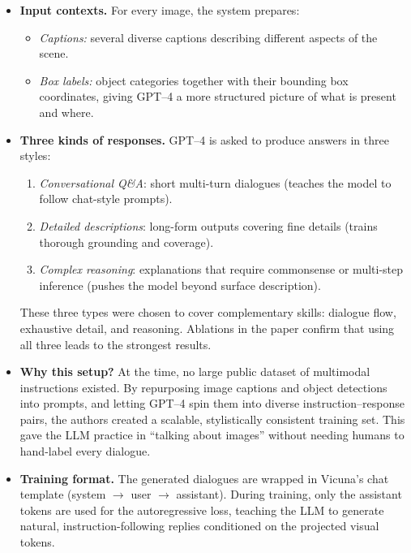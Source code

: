\begin{enrichment}
\begin{enrichment}
        \begin{itemize}
            \item \textbf{Input contexts.} For every image, the system prepares:
            \begin{itemize}
                \item \emph{Captions:} several diverse captions describing different aspects of the scene.  
                \item \emph{Box labels:} object categories together with their bounding box coordinates, giving GPT--4 a more structured picture of what is present and where.
            \end{itemize}
            
            \item \textbf{Three kinds of responses.} GPT--4 is asked to produce answers in three styles:
            \begin{enumerate}
                \item \emph{Conversational Q\&A}: short multi-turn dialogues (teaches the model to follow chat-style prompts).  
                \item \emph{Detailed descriptions}: long-form outputs covering fine details (trains thorough grounding and coverage).  
                \item \emph{Complex reasoning}: explanations that require commonsense or multi-step inference (pushes the model beyond surface description).  
            \end{enumerate}
            These three types were chosen to cover complementary skills: dialogue flow, exhaustive detail, and reasoning. Ablations in the paper confirm that using all three leads to the strongest results.
            
            \item \textbf{Why this setup?} At the time, no large public dataset of multimodal instructions existed. By repurposing image captions and object detections into prompts, and letting GPT--4 spin them into diverse instruction--response pairs, the authors created a scalable, stylistically consistent training set. This gave the LLM practice in “talking about images” without needing humans to hand-label every dialogue.
            
            \item \textbf{Training format.} The generated dialogues are wrapped in Vicuna’s chat template (system $\rightarrow$ user $\rightarrow$ assistant). During training, only the assistant tokens are used for the autoregressive loss, teaching the LLM to generate natural, instruction-following replies conditioned on the projected visual tokens.
        \end{itemize}
        

\end{enrichment}
\end{enrichment}
